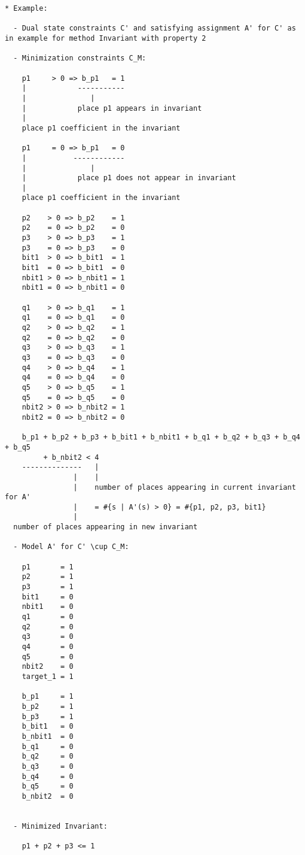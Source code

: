 \begin{verbatim}
* Example:

  - Dual state constraints C' and satisfying assignment A' for C' as in example for method Invariant with property 2

  - Minimization constraints C_M:

    p1     > 0 => b_p1   = 1
    |            -----------
    |               |
    |            place p1 appears in invariant
    |
    place p1 coefficient in the invariant

    p1     = 0 => b_p1   = 0
    |           ------------
    |               |
    |            place p1 does not appear in invariant
    |
    place p1 coefficient in the invariant

    p2    > 0 => b_p2    = 1
    p2    = 0 => b_p2    = 0
    p3    > 0 => b_p3    = 1
    p3    = 0 => b_p3    = 0
    bit1  > 0 => b_bit1  = 1
    bit1  = 0 => b_bit1  = 0
    nbit1 > 0 => b_nbit1 = 1
    nbit1 = 0 => b_nbit1 = 0

    q1    > 0 => b_q1    = 1
    q1    = 0 => b_q1    = 0
    q2    > 0 => b_q2    = 1
    q2    = 0 => b_q2    = 0
    q3    > 0 => b_q3    = 1
    q3    = 0 => b_q3    = 0
    q4    > 0 => b_q4    = 1
    q4    = 0 => b_q4    = 0
    q5    > 0 => b_q5    = 1
    q5    = 0 => b_q5    = 0
    nbit2 > 0 => b_nbit2 = 1
    nbit2 = 0 => b_nbit2 = 0

    b_p1 + b_p2 + b_p3 + b_bit1 + b_nbit1 + b_q1 + b_q2 + b_q3 + b_q4 + b_q5
         + b_nbit2 < 4
    --------------   |
                |    |
                |    number of places appearing in current invariant for A'
                |    = #{s | A'(s) > 0} = #{p1, p2, p3, bit1}
                |
  number of places appearing in new invariant
  
  - Model A' for C' \cup C_M:

    p1       = 1
    p2       = 1
    p3       = 1
    bit1     = 0
    nbit1    = 0
    q1       = 0
    q2       = 0
    q3       = 0
    q4       = 0
    q5       = 0
    nbit2    = 0
    target_1 = 1
    
    b_p1     = 1
    b_p2     = 1
    b_p3     = 1
    b_bit1   = 0
    b_nbit1  = 0
    b_q1     = 0
    b_q2     = 0
    b_q3     = 0
    b_q4     = 0
    b_q5     = 0
    b_nbit2  = 0
    
    
  - Minimized Invariant:

    p1 + p2 + p3 <= 1
\end{verbatim}
    
\newpage

